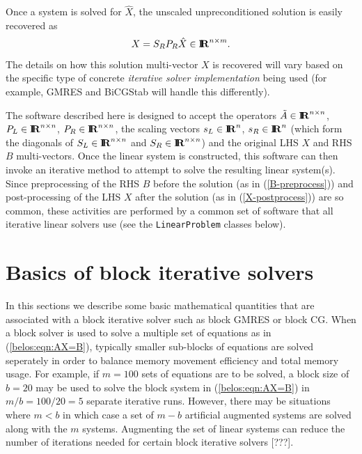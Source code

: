 \documentclass[pdf,ps2pdf,11pt]{SANDreport}
\begin{document}
Once a system is solved for $\hat{X}$, the unscaled unpreconditioned
solution is easily recovered as
%
\begin{equation}
X = S_R P_R \hat{X} \in \mbox{\textbf{I}}\hspace{-0.6ex}\mbox{\textbf{R}}^{n \times m}.
\label{X-postprocess}
\end{equation}
%
{}\noindent{}The details on how this solution multi-vector $X$ is
recovered will vary based on the specific type of concrete
{}\textit{iterative solver implementation} being used (for example,
GMRES and BiCGStab will handle this differently).

The software described here is designed to accept the operators
$\tilde{A}\in\mbox{\textbf{I}}\hspace{-0.6ex}\mbox{\textbf{R}}^{n \times n}$, $P_L\in\mbox{\textbf{I}}\hspace{-0.6ex}\mbox{\textbf{R}}^{n \times n}$,
$P_R\in\mbox{\textbf{I}}\hspace{-0.6ex}\mbox{\textbf{R}}^{n \times n}$, the scaling vectors $s_L\in\mbox{\textbf{I}}\hspace{-0.6ex}\mbox{\textbf{R}}^{n}$,
$s_R\in\mbox{\textbf{I}}\hspace{-0.6ex}\mbox{\textbf{R}}^{n}$ (which form the diagonals of $S_L\in\mbox{\textbf{I}}\hspace{-0.6ex}\mbox{\textbf{R}}^{n
\times n}$ and $S_R\in\mbox{\textbf{I}}\hspace{-0.6ex}\mbox{\textbf{R}}^{n \times n}$) and the original
LHS $X$ and RHS $B$ multi-vectors.  Once the linear system is
constructed, this software can then invoke an iterative method to
attempt to solve the resulting linear system(s).  Since preprocessing
of the RHS $B$ before the solution (as in (\ref{B-preprocess})) and
post-processing of the LHS $X$ after the solution (as in
(\ref{X-postprocess})) are so common, these activities are performed
by a common set of software that all iterative linear solvers use (see
the {}\texttt{Linear\-Problem} classes below).

%
\section{Basics of block iterative solvers}
\label{sec:basic-block-solves}
%

In this sections we describe some basic mathematical quantities that
are associated with a block iterative solver such as block GMRES or
block CG.  When a block solver is used to solve a multiple set of
equations as in (\ref{belos:eqn:AX=B}), typically smaller sub-blocks
of equations are solved seperately in order to balance memory movement
efficiency and total memory usage.  For example, if $m=100$ sets of
equations are to be solved, a block size of $b=20$ may be used to
solve the block system in (\ref{belos:eqn:AX=B}) in $m/b = 100/20 = 5$
separate iterative runs.  However, there may be situations where $m <
b$ in which case a set of $m-b$ artificial augmented systems are
solved along with the $m$ systems.  Augmenting the set of linear
systems can reduce the number of iterations needed for certain block
iterative solvers [???].
\end{document}
